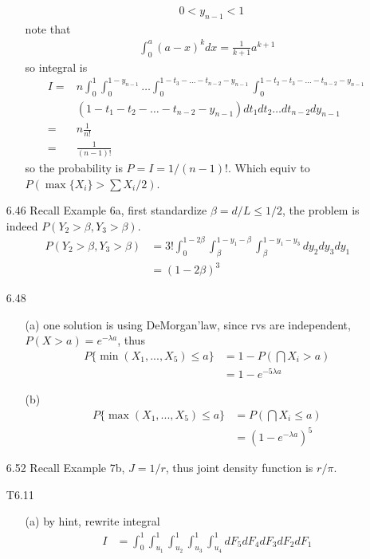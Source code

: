 \documentclass[paper=a4, fontsize=11pt]{scrartcl} %
\numberwithin{equation}{section} %
\numberwithin{figure}{section} %
\numberwithin{table}{section} %
\begin{document}
\begin{itemize}
\begin{itemize}
\begin{align}
			& 0<y_{n-1}<1
		\end{align}
		note that
		\begin{align}
			\int_0^a (a-x)^kdx = \frac{1}{k+1} a^{k+1}
		\end{align}
		so integral is
		\begin{align}
			I =& n \int_0^1 \int_0^{1-y_{n-1}}\dots \int_0^{1-t_3-\dots-t_{n-2}-y_{n-1}}\int_0^{1-t_2-t_3-\dots-t_{n-2}-y_{n-1}} \\
			&(1-t_1-t_2-\dots-t_{n-2}-y_{n-1}) dt_1dt_2\dots dt_{n-2}dy_{n-1} \\
			=& n \frac{1}{n!} \\
			=& \frac{1}{(n-1)!}
		\end{align}
		so the probability is $P=I=1/(n-1)!$. Which equiv to $P(\max\{X_i\} > \sum X_i /2)$.
	\end{itemize}
	\item[6.46] Recall Example 6a, first standardize $\beta = d/L \leq 1/2$, the problem is indeed $P(Y_2>\beta,Y_3>\beta)$.
	\begin{align}
		P(Y_2>\beta,Y_3>\beta) &= 3! \int_0^{1-2\beta}\int_\beta^{1-y_1-\beta}\int_\beta^{1-y_1-y_3}dy_2dy_3dy_1\\
			&= (1-2\beta)^3
	\end{align}
	\item[6.48]
	\begin{itemize}
		\item[(a)] one solution is using DeMorgan'law, since rvs are independent, $P(X>a)=e^{-\lambda a}$, thus
		\begin{align}
			P\{\min(X_1,...,X_5)\leq a\} &= 1 - P(\bigcap X_i>a) \\
				&= 1- e^{-5\lambda a}
		\end{align}
		\item[(b)]
		\begin{align}
			P\{\max(X_1,...,X_5)\leq a\} &= P(\bigcap X_i\leq a) \\
				&= (1 - e^{-\lambda a })^5
		\end{align}
	\end{itemize}
	\item[6.52] Recall Example 7b, $J= 1/r$, thus joint density function is $r/\pi$.
	\item[T6.11]
	\begin{itemize}
		\item[(a)] by hint, rewrite integral
		\begin{align}
			I &= \int_0^1\int_{u_1}^1\int_{u_2}^1\int_{u_3}^1\int_{u_4}^1 dF_5dF_4dF_3dF_2dF_1 \\

\end{align}
\end{itemize}
\end{itemize}
\end{document}
